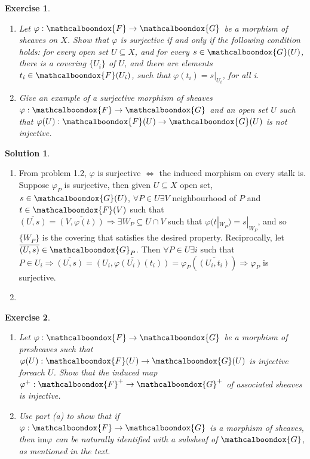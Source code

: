 \documentclass[12pt]{article}
\newcommand{\imp}{\ensuremath{\Rightarrow}}
\newcommand{\ima}{\ensuremath{\text{im}}}
\newtheorem{ex}{Exercise}[section]
\theoremstyle{definition}
\newtheorem*{sol}{Solution}
\newcommand{\sF}{\ensuremath{\mathcalboondox{F}}}
\newcommand{\sG}{\ensuremath{\mathcalboondox{G}}}
\begin{document}
\begin{ex}
	\begin{enumerate}[label=\alph*)]
		\item Let $\varphi: \sF \to \sG$ be a morphism of sheaves on $X$. Show that $\varphi$ is surjective if and only if the following condition holds: for every open set $U \subseteq X$, and for every $s \in \sG(U)$, there is a covering $\{U_i\}$ of $U$, and there are elements $t_i \in \sF(U_i)$, such that $\varphi(t_i) = s|_{U_i}$, for all i.

		\item Give an example of a surjective morphism of sheaves $\varphi: \sF \to \sG$ and an open set $U$ such that $\varphi(U): \sF(U) \to \sG(U)$ is not injective.
	\end{enumerate}
\end{ex}

\begin{sol}
	\begin{enumerate}[label=\alph*)]
		\item From problem 1.2, $\varphi$ is surjective $\iff$ the induced morphism on every stalk is. Suppose $\varphi_P$ is surjective, then given $U \subseteq X$ open set, $s \in \sG(U)$, $\forall P \in U \exists V$ neighbourhood of $P$ and $t \in \sF(V)$ such that $\overline{(U,s)} = \overline{(V,\varphi(t))} \imp \exists W_P \subseteq U \cap V$ such that $\varphi(t|_{W_P}) = s|_{W_P}$, and so $\{W_P\}$ is the covering that satisfies the desired property. Reciprocally, let $\overline{(U,s)} \in \sG_P$. Then $\forall P \in U \exists i$ such that $P \in U_i \imp \overline{(U,s)} = \overline{(U_i, \varphi(U_i)(t_i))} = \varphi_P(\overline{(U_i, t_i)}) \imp \varphi_P$ is surjective.

		\item
	\end{enumerate}
\end{sol}

\begin{ex}
	\begin{enumerate}[label=\alph*)]
		\item Let $\varphi: \sF \to \sG$ be a morphism of presheaves such that $\varphi(U): \sF(U) \to \sG(U)$ is injective foreach $U$. Show that the induced map $\varphi^{+}: \sF^{+} \to \sG^{+}$ of associated sheaves is injective.

		\item Use part (a) to show that if $\varphi: \sF \to \sG$ is a morphism of sheaves, then $\ima \varphi$ can be naturally identified with a subsheaf of $\sG$, as mentioned in the text.
	\end{enumerate}
\end{ex}
\end{document}
